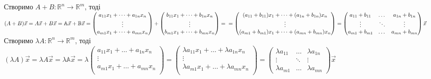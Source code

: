 \documentclass[a4paper, 10pt]{article}
\theoremstyle{theoremdd}
\theoremstyle{theoremdd}
\theoremstyle{theoremdd}
\theoremstyle{theoremdd}
\theoremstyle{theoremdd}
\theoremstyle{theoremdd}
\theoremstyle{theoremdd}
\theoremstyle{theoremdd}
\begin{document}
	Створимо $A+B: \mathbb{R}^n \to \mathbb{R}^m$, тоді\\
	$(A+B)\vec{x} = A \vec{x} + B \vec{x} = \mathbb{A} \vec{x} + \mathbb{B} \vec{x} = \begin{pmatrix}
	a_{11}x_1 + \dots + a_{1n} x_n \\
	\vdots \\
	a_{m1}x_1 + \dots + a_{mn} x_n \\
	\end{pmatrix} + \begin{pmatrix}
	b_{11}x_1 + \dots + b_{1n} x_n \\
	\vdots \\
	b_{m1}x_1 + \dots + b_{mn} x_n \\
	\end{pmatrix} = \\
	= \begin{pmatrix}
	(a_{11}+b_{11})x_1 + \dots + (a_{1n}+b_{1n}) x_n \\
	\vdots \\
	(a_{m1} + b_{m1})x_1 + \dots + (a_{mn}+b_{mn}) x_n \\
	\end{pmatrix} = \begin{pmatrix}
	a_{11} + b_{11} & \dots & a_{1n} + b_{1n} \\
	\vdots & \ddots & \vdots \\
	a_{m1} + b_{m1} & \dots & a_{mn} + b_{mn}
	\end{pmatrix} \vec{x}$
	\bigskip \\
	Створимо $\lambda A: \mathbb{R}^n \to \mathbb{R}^m$, тоді\\
	$(\lambda A)\vec{x} = \lambda A \vec{x} = \lambda \mathbb{A} \vec{x} = \lambda \begin{pmatrix}
	a_{11}x_1 + \dots + a_{1n} x_n \\
	\vdots \\
	a_{m1}x_1 + \dots + a_{mn} x_n \\
	\end{pmatrix}
	= \begin{pmatrix}
	\lambda a_{11}x_1 + \dots + \lambda a_{1n} x_n \\
	\vdots \\
	\lambda a_{m1} x_1 + \dots + \lambda a_{mn} x_n \\
	\end{pmatrix} = \begin{pmatrix}
	\lambda a_{11} & \dots & \lambda a_{1n}\\
	\vdots & \ddots & \vdots \\
	\lambda a_{m1} & \dots & \lambda a_{mn}
	\end{pmatrix} \vec{x}$
\end{document}
